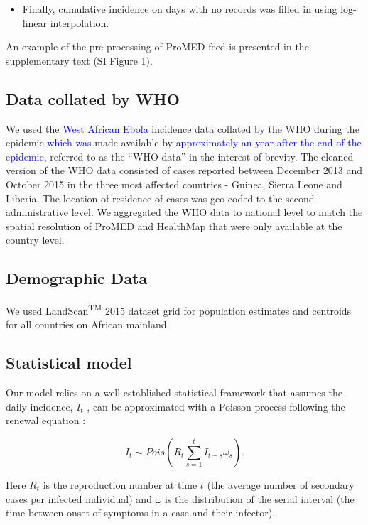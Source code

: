 \documentclass[9pt,twocolumn,twoside,lineno]{pnas-new}
\newcommand{\sangeeta}[1]{\textcolor{blue}{#1}}
\begin{document}
{\begin{itemize}
\item
  Finally, cumulative incidence on days with no records was filled in
  using log-linear interpolation.
\end{itemize}

An example of the pre-processing of ProMED feed is presented in the
supplementary text (SI Figure 1).

\subsection*{Data collated by WHO}\label{data-collated-by-who}

We used the \sangeeta{West African Ebola} incidence data collated by the WHO during the 
epidemic \sangeeta{which was} made available by \cite{garske20160308}
\sangeeta{approximately an year after the end of the epidemic}, referred to as
the ``WHO data'' in the interest of brevity. The cleaned version of the
WHO data consisted of cases reported between December 2013 and October
2015 in the three most affected countries - Guinea, Sierra Leone and
Liberia. The location of residence of cases was geo-coded to the second
administrative level. We aggregated the WHO data to national level to
match the spatial resolution of ProMED and HealthMap that were only
available at the country level.

\subsection*{Demographic Data}\label{demographic-data}

We used LandScan\textsuperscript{TM} 2015 dataset grid \cite{landscan}
for population estimates and centroids for all countries on African
mainland.

\subsection*{Statistical model}\label{statistical-model}

Our model relies on a well-established statistical framework that
assumes the daily incidence, \(I_t\) , can be approximated with a
Poisson process following the renewal equation
\cite{fraser2007estimating}:

\begin{equation*}
  I_{t} \sim 
  Pois
  \left( 
    R_t \sum_{s = 1}^{t}{I_{t - s}\omega_s}
  \right).
\end{equation*}

Here \(R_t\) is the reproduction number at time \(t\) (the average
number of secondary cases per infected individual) and \(\omega\) is the
distribution of the serial interval (the time between onset of symptoms
in a case and their infector).

}
\end{document}
